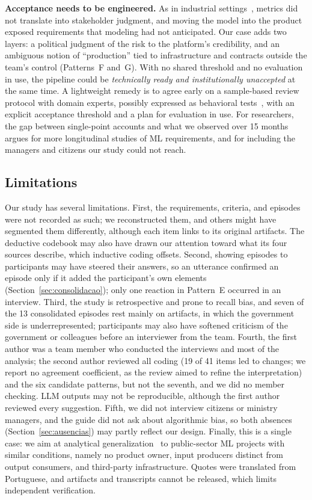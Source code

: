 \documentclass[sigconf,nonacm]{acmart}
\begin{document}
\textbf{Acceptance needs to be engineered.} As in industrial settings~\cite{vogelsang2019,nahar2022,paleyes2022}, metrics did not translate into stakeholder judgment, and moving the model into the product exposed requirements that modeling had not anticipated. Our case adds two layers: a political judgment of the risk to the platform's credibility, and an ambiguous notion of ``production'' tied to infrastructure and contracts outside the team's control (Patterns~F and~G). With no shared threshold and no evaluation in use, the pipeline could be \textit{technically ready and institutionally unaccepted} at the same time. A lightweight remedy is to agree early on a sample-based review protocol with domain experts, possibly expressed as behavioral tests~\cite{ribeiro2020}, with an explicit acceptance threshold and a plan for evaluation in use. For researchers, the gap between single-point accounts and what we observed over 15 months argues for more longitudinal studies of ML requirements, and for including the managers and citizens our study could not reach.


\subsection{Limitations}
\label{sec:threats}
Our study has several limitations. First, the requirements, criteria, and episodes were not recorded as such; we reconstructed them, and others might have segmented them differently, although each item links to its original artifacts. The deductive codebook may also have drawn our attention toward what its four sources describe, which inductive coding offsets. Second, showing episodes to participants may have steered their answers, so an utterance confirmed an episode only if it added the participant's own elements (Section~\ref{sec:consolidacao}); only one reaction in Pattern~E occurred in an interview. Third, the study is retrospective and prone to recall bias, and seven of the 13 consolidated episodes rest mainly on artifacts, in which the government side is underrepresented; participants may also have softened criticism of the government or colleagues before an interviewer from the team. Fourth, the first author was a team member who conducted the interviews and most of the analysis; the second author reviewed all coding (19 of 41 items led to changes; we report no agreement coefficient, as the review aimed to refine the interpretation) and the six candidate patterns, but not the seventh, and we did no member checking. LLM outputs may not be reproducible, although the first author reviewed every suggestion. Fifth, we did not interview citizens or ministry managers, and the guide did not ask about algorithmic bias, so both absences (Section~\ref{sec:ausencias}) may partly reflect our design. Finally, this is a single case: we aim at analytical generalization~\cite{yin2018} to public-sector ML projects with similar conditions, namely no product owner, input producers distinct from output consumers, and third-party infrastructure. Quotes were translated from Portuguese, and artifacts and transcripts cannot be released, which limits independent verification.
\end{document}
